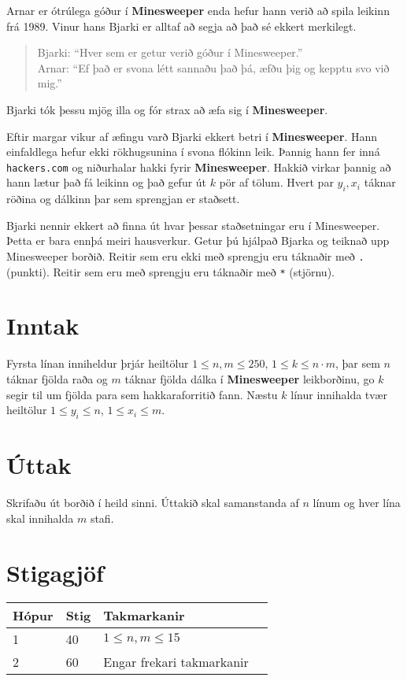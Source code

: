 
Arnar er ótrúlega góður í \textbf{Minesweeper} enda hefur hann verið að spila leikinn frá 1989. Vinur hans Bjarki er alltaf að segja að það sé ekkert merkilegt.
\begin{quote}
    Bjarki: ``Hver sem er getur verið góður í Minesweeper.''\\
    Arnar: ``Ef það er svona létt sannaðu það þá, æfðu þig og kepptu svo við mig.''\\
\end{quote}

Bjarki tók þessu mjög illa og fór strax að æfa sig í \textbf{Minesweeper}.

Eftir margar vikur af æfingu varð Bjarki ekkert betri í \textbf{Minesweeper}.
Hann einfaldlega hefur ekki rökhugsunina í svona flókinn leik.
Þannig hann fer inná \texttt{hackers.com} og niðurhalar hakki fyrir \textbf{Minesweeper}.
Hakkið virkar þannig að hann lætur það fá leikinn og það gefur út $k$ pör af tölum.
Hvert par $y_i,x_i$ táknar röðina og dálkinn þar sem sprengjan er staðsett.

Bjarki nennir ekkert að finna út hvar þessar staðsetningar eru í Minesweeper.
Þetta er bara ennþá meiri hausverkur. Getur þú hjálpað Bjarka og teiknað upp Minesweeper borðið.
Reitir sem eru ekki með sprengju eru táknaðir með \texttt{.} (punkti).
Reitir sem eru með sprengju eru táknaðir með \texttt{*} (stjörnu).

\section*{Inntak}
Fyrsta línan inniheldur þrjár heiltölur $1 \le n,m \le 250$, $1 \le k \le n \cdot m$,
þar sem $n$ táknar fjölda raða og $m$ táknar fjölda dálka í \textbf{Minesweeper} leikborðinu,
go $k$ segir til um fjölda para sem hakkaraforritið fann.
Næstu $k$ línur innihalda tvær heiltölur $1 \le y_i \le n$, $1 \le x_i \le m$.

\section*{Úttak}
Skrifaðu út borðið í heild sinni. Úttakið skal samanstanda af $n$ línum og hver
lína skal innihalda $m$ stafi.

\section*{Stigagjöf}
\begin{tabular}{|l|l|l|l|}
\hline
Hópur & Stig & Takmarkanir \\ \hline
1     & 40    & $1 \le n,m \le 15$ \\ \hline
2     & 60    & Engar frekari takmarkanir \\ \hline
\end{tabular}
